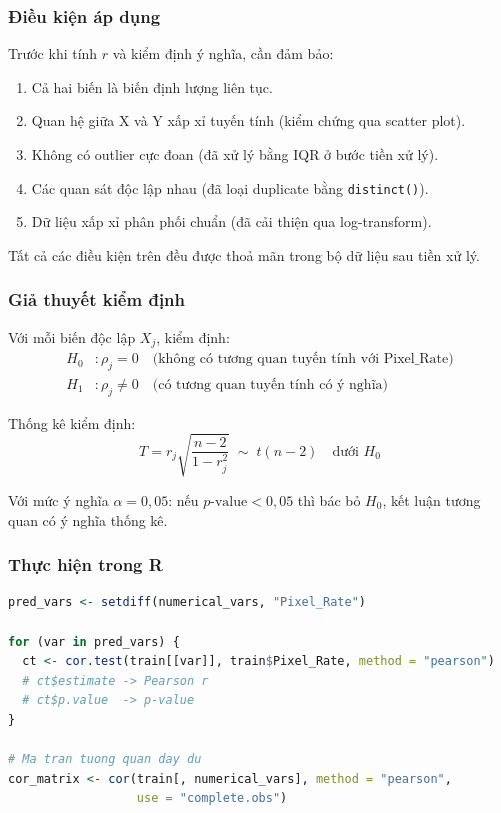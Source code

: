 \subsubsection{Điều kiện áp dụng}

Trước khi tính $r$ và kiểm định ý nghĩa, cần đảm bảo:
\begin{enumerate}
  \item Cả hai biến là biến định lượng liên tục.
  \item Quan hệ giữa X và Y xấp xỉ tuyến tính (kiểm chứng qua scatter plot).
  \item Không có outlier cực đoan (đã xử lý bằng IQR ở bước tiền xử lý).
  \item Các quan sát độc lập nhau (đã loại duplicate bằng \texttt{distinct()}).
  \item Dữ liệu xấp xỉ phân phối chuẩn (đã cải thiện qua log-transform).
\end{enumerate}

Tất cả các điều kiện trên đều được thoả mãn trong bộ dữ liệu sau tiền xử lý.

\subsubsection{Giả thuyết kiểm định}

Với mỗi biến độc lập $X_j$, kiểm định:
\begin{align*}
  H_0 &: \rho_j = 0 \quad \text{(không có tương quan tuyến tính với Pixel\_Rate)} \\
  H_1 &: \rho_j \neq 0 \quad \text{(có tương quan tuyến tính có ý nghĩa)}
\end{align*}

Thống kê kiểm định:
\[
  T = r_j \sqrt{\frac{n-2}{1-r_j^2}} \;\sim\; t(n-2) \quad \text{dưới } H_0
\]

Với mức ý nghĩa $\alpha = 0{,}05$: nếu $p\text{-value} < 0{,}05$ thì bác bỏ $H_0$,
kết luận tương quan có ý nghĩa thống kê.

\subsubsection{Thực hiện trong R}

\begin{lstlisting}[language=R, caption={Tính hệ số tương quan Pearson}]
pred_vars <- setdiff(numerical_vars, "Pixel_Rate")

for (var in pred_vars) {
  ct <- cor.test(train[[var]], train$Pixel_Rate, method = "pearson")
  # ct$estimate -> Pearson r
  # ct$p.value  -> p-value
}

# Ma tran tuong quan day du
cor_matrix <- cor(train[, numerical_vars], method = "pearson",
                  use = "complete.obs")
\end{lstlisting}

